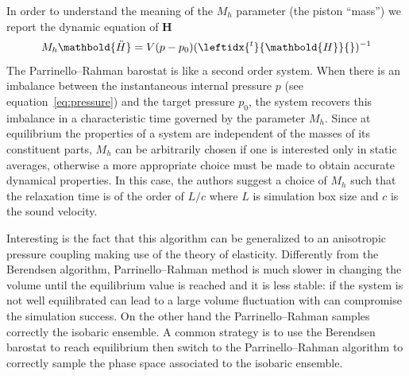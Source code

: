 In order to understand the meaning of the $M_h$ parameter (the piston ``mass'') we report the dynamic equation of $\mathbold H$
\begin{equation*}
	M_h \mathbold{\ddot H} = V (p - p_0) (\leftidx{^t}{\mathbold{H}}{})^{-1}
\end{equation*}
The Parrinello--Rahman barostat is like a second order system. When there is an imbalance between the 
instantaneous internal pressure $p$ (see equation~\eqref{eq:pressure}) and the target pressure $p_0$, the system 
recovers this imbalance in a characteristic time governed by the parameter $M_h$. Since at equilibrium the 
properties of a system are independent of the masses of its constituent parts, $M_h$ can be arbitrarily chosen if 
one is interested only in static averages, otherwise a more appropriate choice must be made to obtain accurate 
dynamical properties. In this case, the authors suggest a choice of $M_h$ such that the relaxation time is of the 
order of $L/c$ where $L$ is simulation box size and $c$ is the sound velocity. 

Interesting is the fact that this algorithm can be generalized to an anisotropic pressure coupling making use of 
the theory of elasticity. Differently from the Berendsen algorithm, Parrinello--Rahman method is much slower in 
changing the volume until the equilibrium value is reached and it is less stable: if the system is not well 
equilibrated can lead to a large volume fluctuation with can compromise the simulation success. On the other hand 
the Parrinello--Rahman samples correctly the isobaric ensemble. A common strategy is to use the Berendsen 
barostat to reach equilibrium then switch to the Parrinello--Rahman algorithm to correctly sample the phase space 
associated to the isobaric ensemble.

